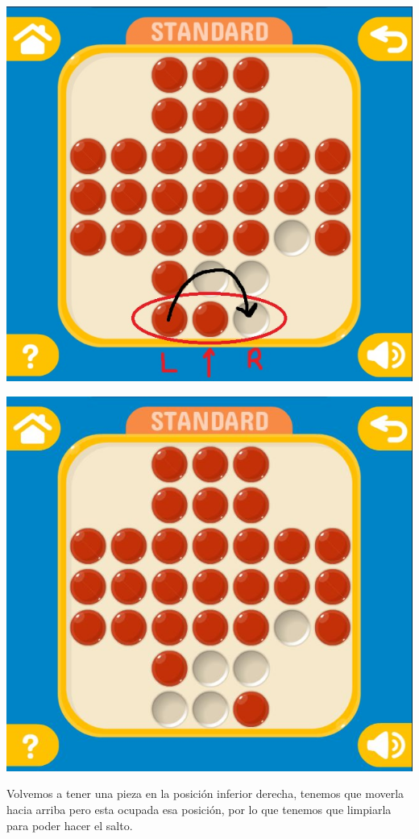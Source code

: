 \documentclass[10pt,a4paper]{report}
\begin{document}
\begin{center}
	\includegraphics[scale=.3]{5.jpg} \hspace{6cm}
	
	\includegraphics[scale=.4]{6.jpg} \hspace{6cm} 
\end{center}
\pagebreak 
Volvemos a tener una pieza en la posición inferior derecha, tenemos que moverla hacia arriba
pero esta ocupada esa posición, por lo que tenemos que limpiarla para poder hacer el salto.
\end{document}
